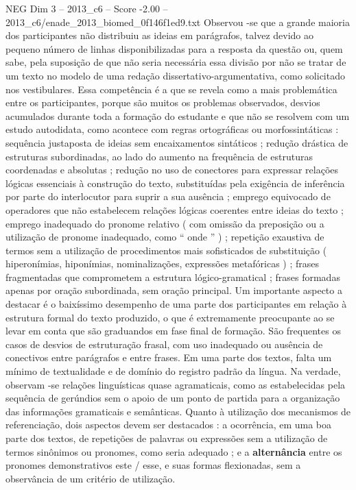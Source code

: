 \begin{textsample}{NEG Dim 3 – 2013\_c6 – Score -2.00 – 2013\_c6/enade\_2013\_biomed\_0f146f1ed9.txt}
Observou -se que a grande maioria dos participantes não distribuiu as ideias em parágrafos, talvez devido ao pequeno número de linhas disponibilizadas para a resposta da questão ou, quem sabe, pela suposição de que não seria necessária essa divisão por não se tratar de um texto no modelo de uma redação dissertativo-argumentativa, como solicitado nos vestibulares.
Essa competência é a que se revela como a mais problemática entre os participantes, porque são muitos os problemas observados, desvios acumulados durante toda a formação do estudante e que não se resolvem com um estudo autodidata, como acontece com regras ortográficas ou morfossintáticas : sequência justaposta de ideias sem encaixamentos sintáticos ; redução drástica de estruturas subordinadas, ao lado do aumento na frequência de estruturas coordenadas e absolutas ; redução no uso de conectores para expressar relações lógicas essenciais à construção do texto, substituídas pela exigência de inferência por parte do interlocutor para suprir a sua ausência ; emprego equivocado de operadores que não estabelecem relações lógicas coerentes entre ideias do texto ; emprego inadequado do pronome relativo ( com omissão da preposição ou a utilização de pronome inadequado, como “ onde ” ) ; repetição exaustiva de termos sem a utilização de procedimentos mais sofisticados de substituição ( hiperonímias, hiponímias, nominalizações, expressões metafóricas ) ; frases fragmentadas que comprometem a estrutura lógico-gramatical ; frases formadas apenas por oração subordinada, sem oração principal.
Um importante aspecto a destacar é o baixíssimo desempenho de uma parte dos participantes em relação à estrutura formal do texto produzido, o que é extremamente preocupante ao se levar em conta que são graduandos em fase final de formação.
São frequentes os casos de desvios de estruturação frasal, com uso inadequado ou ausência de conectivos entre parágrafos e entre frases.
Em uma parte dos textos, falta um mínimo de textualidade e de domínio do registro padrão da língua.
Na verdade, observam -se relações linguísticas quase agramaticais, como as estabelecidas pela sequência de gerúndios sem o apoio de um ponto de partida para a organização das informações gramaticais e semânticas.
Quanto à utilização dos mecanismos de referenciação, dois aspectos devem ser destacados : a ocorrência, em uma boa parte dos textos, de repetições de palavras ou expressões sem a utilização de termos sinônimos ou pronomes, como seria adequado ; e a \textbf{alternância} entre os pronomes demonstrativos este / esse, e suas formas flexionadas, sem a observância de um critério de utilização.

\end{textsample}
